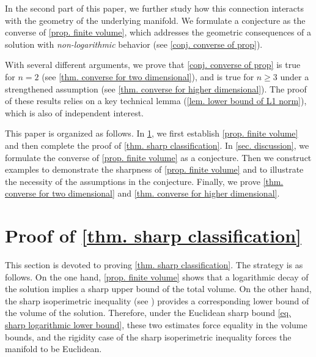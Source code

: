 \documentclass[12pt]{amsart}
\theoremstyle{plain}
\theoremstyle{definition}
\theoremstyle{remark}     %
\begin{document}
  In the second part of this paper, we further study how  this connection interacts with the geometry of the underlying manifold.
  We formulate a conjecture as the converse of \cref{prop. finite volume}, which addresses the geometric consequences of a solution with \emph{non-logarithmic} behavior (see \cref{conj. converse of prop}). 

  With several different arguments, we prove that \cref{conj. converse of prop} is true for $n=2$ (see \cref{thm. converse for two dimensional}), and is true for $n\geq 3$ under a strengthened assumption (see \cref{thm. converse for higher dimensional}). The proof of these results relies on a key technical lemma (\cref{lem. lower bound of L1 norm}), which is also of independent interest.

This paper is organized as follows. In \cref{sec. proof}, we first establish \cref{prop. finite volume} and then complete the proof of \cref{thm. sharp classification}. 
In \cref{sec. discussion}, we formulate the converse of \cref{prop. finite volume} as a conjecture. Then we construct examples to demonstrate the sharpness of \cref{prop. finite volume} and to illustrate the necessity of the assumptions in the conjecture.
Finally, we prove \cref{thm. converse for two dimensional} and \cref{thm. converse for higher dimensional}.
 
 
 
 
\section{Proof of \cref{thm. sharp classification}}\label{sec. proof}

This section is devoted to proving \cref{thm. sharp classification}. The strategy is as follows.
 On the one hand, \cref{prop. finite volume} shows that a logarithmic decay of the solution implies a sharp upper bound of the total volume.
 On the other hand, the sharp isoperimetric inequality (see \cite{Bre23}) provides a corresponding lower bound of the volume of the solution. Therefore, under the Euclidean sharp  bound \cref{eq. sharp logarithmic lower bound},
 these two estimates force equality in the volume bounds, and the rigidity case of the sharp isoperimetric inequality forces the manifold to be Euclidean.
\end{document}
